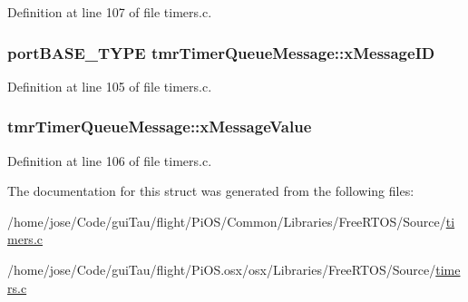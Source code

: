Definition at line 107 of file timers.\-c.

\hypertarget{structtmr_timer_queue_message_a3938c01850a4c0e7254bd8a585d4046e}{
\subsubsection[{x\-Message\-I\-D}]{\setlength{\rightskip}{0pt plus 5cm}port\-B\-A\-S\-E\-\_\-\-T\-Y\-P\-E tmr\-Timer\-Queue\-Message\-::x\-Message\-I\-D}}\label{structtmr_timer_queue_message_a3938c01850a4c0e7254bd8a585d4046e}


Definition at line 105 of file timers.\-c.

\hypertarget{structtmr_timer_queue_message_a3bab3174777bfdfa6ab4d17f84c034da}{
\subsubsection[{x\-Message\-Value}]{ tmr\-Timer\-Queue\-Message\-::x\-Message\-Value}}\label{structtmr_timer_queue_message_a3bab3174777bfdfa6ab4d17f84c034da}


Definition at line 106 of file timers.\-c.



The documentation for this struct was generated from the following files\-:\begin{DoxyCompactItemize}
\item 
/home/jose/\-Code/gui\-Tau/flight/\-Pi\-O\-S/\-Common/\-Libraries/\-Free\-R\-T\-O\-S/\-Source/\hyperlink{_common_2_libraries_2_free_r_t_o_s_2_source_2timers_8c}{timers.\-c}\item 
/home/jose/\-Code/gui\-Tau/flight/\-Pi\-O\-S.\-osx/osx/\-Libraries/\-Free\-R\-T\-O\-S/\-Source/\hyperlink{osx_2osx_2_libraries_2_free_r_t_o_s_2_source_2timers_8c}{timers.\-c}\end{DoxyCompactItemize}
